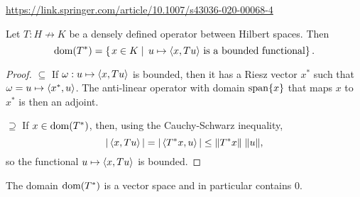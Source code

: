 \url{https://link.springer.com/article/10.1007/s43036-020-00068-4}

\begin{lemma}
Let $T: H\not\to K$ be a densely defined operator between Hilbert spaces. Then
\[ \operatorname{dom}(T^*) = \left\{\left. x\in K \;\right|\; \text{$u\mapsto \left\langle x, Tu \right\rangle$ is a bounded functional} \right\}. \]
\end{lemma}
\begin{proof}
$\boxed{\subseteq}$ If $\omega: u\mapsto \left\langle x, Tu \right\rangle$ is bounded, then it has a Riesz vector $x^*$ such that $\omega = u\mapsto \left\langle x^*, u \right\rangle$. The anti-linear operator with domain $\operatorname{span}\{x\}$ that maps $x$ to $x^*$ is then an adjoint.

$\boxed{\supseteq}$ If $x\in\operatorname{dom}(T^*)$, then, using the Cauchy-Schwarz inequality,
\[ |\left\langle x,Tu \right\rangle| = |\left\langle T^*x,u \right\rangle| \leq \lVert T^*x\rVert\;\lVert u\rVert, \]
so the functional $u\mapsto \left\langle x, Tu \right\rangle$ is bounded.
\end{proof}
\begin{corollary}
The domain $\operatorname{dom}(T^*)$ is a vector space and in particular contains $0$.
\end{corollary}

